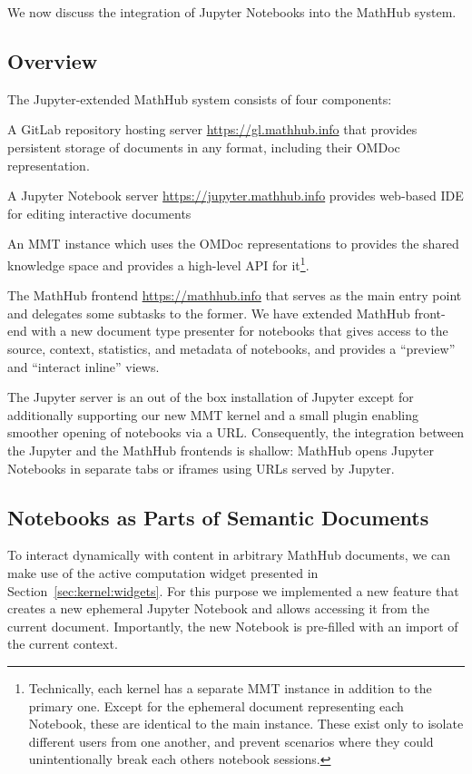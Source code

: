 We now discuss the integration of Jupyter Notebooks into the MathHub system.

\subsection{Overview}

The Jupyter-extended MathHub system consists of four components:
\begin{compactenum}
\item A GitLab repository hosting server \url{https://gl.mathhub.info} that provides persistent storage of documents in any format, including their OMDoc representation.
\item A Jupyter Notebook server \url{https://jupyter.mathhub.info} provides web-based IDE for editing interactive documents
\item An MMT instance which uses the OMDoc representations to provides the shared knowledge space and provides a high-level API for it\footnote{
    Technically, each kernel has a separate MMT instance in addition to the primary one. 
    Except for the ephemeral document representing each Notebook, these are identical to the main instance. 
    These exist only to isolate different users from one another, and prevent scenarios where they could unintentionally break each others notebook sessions.  
  }.
\item The MathHub frontend \url{https://mathhub.info} that serves as the main entry point and delegates some subtasks to the former.
  We have extended MathHub front-end with a new document type presenter for notebooks that gives access to the source, context, statistics, and metadata of notebooks, and provides a ``preview'' and ``interact inline'' views.  
\end{compactenum}

The Jupyter server is an out of the box installation of Jupyter except for additionally supporting our new MMT kernel and a small plugin enabling smoother opening of notebooks via a URL. 
Consequently, the integration between the Jupyter and the MathHub frontends is shallow: MathHub opens Jupyter Notebooks in separate tabs or iframes using URLs served by Jupyter.

\subsection{Notebooks as Parts of Semantic Documents}

To interact dynamically with content in arbitrary MathHub documents, we can make use of the active computation widget presented in Section~\ref{sec:kernel:widgets}. 
For this purpose we implemented a new feature that creates a new ephemeral Jupyter Notebook and allows accessing it from the current document. 
Importantly, the new Notebook is pre-filled with an import of the current context. 

